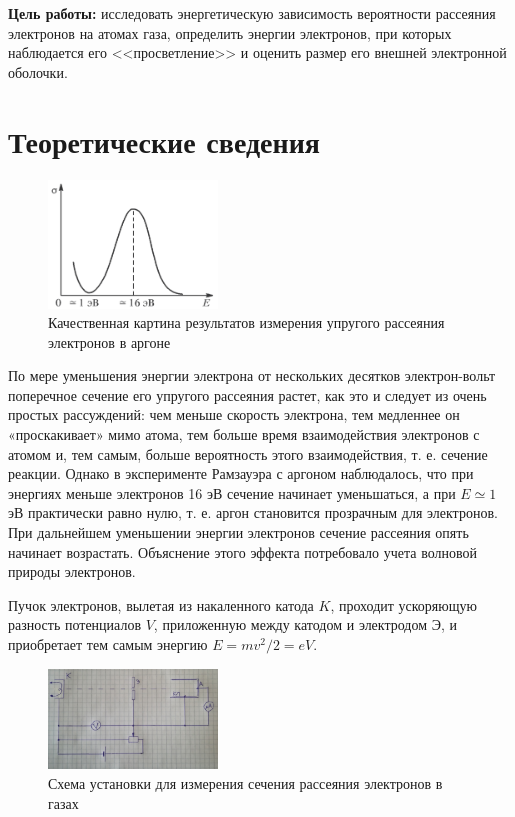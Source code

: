



	
	\newpage
	
	\textbf{Цель работы:} исследовать энергетическую зависимость вероятности рассеяния электронов на атомах газа, определить энергии электронов, при которых наблюдается его <<просветление>> и оценить размер его внешней электронной оболочки.

	\section*{Теоретические сведения}
	\begin{figure}
		\includegraphics[width=0.4\textwidth]{./Pictures/2.png}
		\caption{Качественная картина результатов измерения упругого рассеяния электронов в аргоне}
	\end{figure}


	По мере уменьшения энергии электрона от нескольких десятков электрон-вольт поперечное сечение его упругого рассеяния растет, как это и следует из очень простых рассуждений: чем меньше скорость электрона, тем медленнее он «проскакивает» мимо атома, тем больше время взаимодействия электронов с атомом и, тем самым, больше вероятность этого взаимодействия, т. е. сечение реакции. Однако в эксперименте Рамзауэра с аргоном наблюдалось, что при энергиях меньше электронов 16 эВ сечение начинает уменьшаться, а при $E \simeq 1$ эВ практически равно нулю, т. е. аргон становится прозрачным для электронов. При дальнейшем уменьшении энергии электронов сечение рассеяния опять начинает возрастать. Объяснение этого эффекта потребовало учета волновой природы электронов.
	
	Пучок электронов, вылетая из накаленного катода $K$, проходит ускоряющую разность потенциалов $V$, приложенную между катодом и электродом Э, и приобретает тем самым энергию $E = mv^2/2 = eV$.
	\begin{figure}
		\includegraphics[width=0.4\textwidth]{./Pictures/1.jpg}
		\caption{Схема установки для измерения сечения рассеяния электронов в газах}
	\end{figure}


